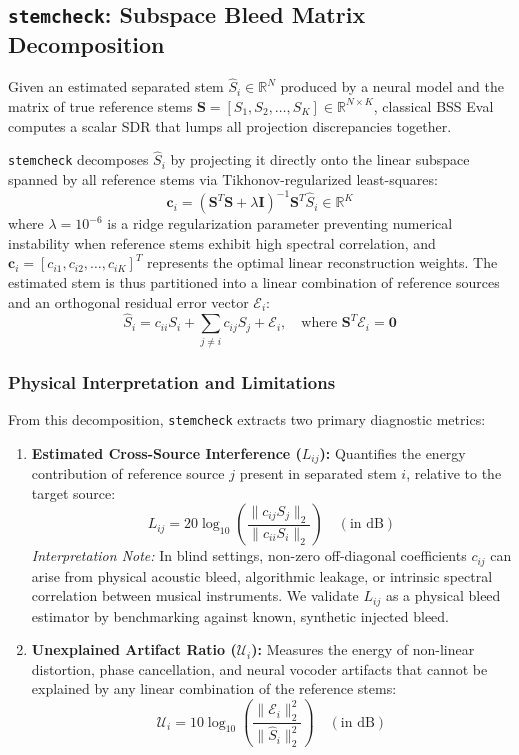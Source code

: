 \documentclass[10pt,journal,compsoc]{IEEEtran}
\begin{document}
\subsection{\texttt{stemcheck}: Subspace Bleed Matrix Decomposition}
Given an estimated separated stem $\hat{S}_i \in \mathbb{R}^N$ produced by a neural model and the matrix of true reference stems $\mathbf{S} = [S_1, S_2, \dots, S_K] \in \mathbb{R}^{N \times K}$, classical BSS Eval computes a scalar SDR that lumps all projection discrepancies together.

\texttt{stemcheck} decomposes $\hat{S}_i$ by projecting it directly onto the linear subspace spanned by all reference stems via Tikhonov-regularized least-squares:
\begin{equation}
\mathbf{c}_i = (\mathbf{S}^T \mathbf{S} + \lambda \mathbf{I})^{-1} \mathbf{S}^T \hat{S}_i \in \mathbb{R}^K
\end{equation}
where $\lambda = 10^{-6}$ is a ridge regularization parameter preventing numerical instability when reference stems exhibit high spectral correlation, and $\mathbf{c}_i = [c_{i1}, c_{i2}, \dots, c_{iK}]^T$ represents the optimal linear reconstruction weights. The estimated stem is thus partitioned into a linear combination of reference sources and an orthogonal residual error vector $\mathcal{E}_i$:
\begin{equation}
\hat{S}_i = c_{ii} S_i + \sum_{j \ne i} c_{ij} S_j + \mathcal{E}_i, \quad \text{where } \mathbf{S}^T \mathcal{E}_i = \mathbf{0}
\end{equation}

\subsubsection{Physical Interpretation and Limitations}
From this decomposition, \texttt{stemcheck} extracts two primary diagnostic metrics:
\begin{enumerate}
    \item \textbf{Estimated Cross-Source Interference ($L_{ij}$):} Quantifies the energy contribution of reference source $j$ present in separated stem $i$, relative to the target source:
    \begin{equation}
    L_{ij} = 20 \log_{10} \left( \frac{\|c_{ij} S_j\|_2}{\|c_{ii} S_i\|_2} \right) \quad (\text{in dB})
    \end{equation}
    \textit{Interpretation Note:} In blind settings, non-zero off-diagonal coefficients $c_{ij}$ can arise from physical acoustic bleed, algorithmic leakage, or intrinsic spectral correlation between musical instruments. We validate $L_{ij}$ as a physical bleed estimator by benchmarking against known, synthetic injected bleed.
    \item \textbf{Unexplained Artifact Ratio ($\mathcal{U}_i$):} Measures the energy of non-linear distortion, phase cancellation, and neural vocoder artifacts that cannot be explained by any linear combination of the reference stems:
    \begin{equation}
    \mathcal{U}_i = 10 \log_{10} \left( \frac{\|\mathcal{E}_i\|_2^2}{\|\hat{S}_i\|_2^2} \right) \quad (\text{in dB})
    \end{equation}
\end{enumerate}
\end{document}
